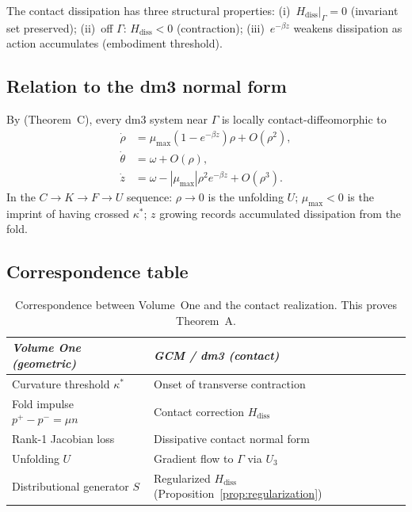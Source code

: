 \documentclass[12pt, oneside]{book}
\theoremstyle{plain}
\theoremstyle{definition}
\theoremstyle{remark}
\newcommand{\Orb}{\Gamma}
\newcommand{\abs}[1]{\left|#1\right|}
\begin{document}
The contact dissipation has three structural properties:
(i)~$H_{\mathrm{diss}}|_\Orb=0$ (invariant set preserved);
(ii)~off $\Orb$: $H_{\mathrm{diss}}<0$ (contraction);
(iii)~$e^{-\beta z}$ weakens dissipation as action accumulates
(embodiment threshold).

\subsection{Relation to the dm3 normal form}

By \cite{Paper1} (Theorem~C), every dm3 system near $\Orb$ is
locally contact-diffeomorphic to
\begin{align}
  \dot\rho &= \mu_{\max}(1-e^{-\beta z})\rho + O(\rho^2),\\
  \dot\theta &= \omega + O(\rho),\\
  \dot z &= \omega - \abs{\mu_{\max}}\rho^2 e^{-\beta z} + O(\rho^3).
\end{align}
In the $C\to K\to F\to U$ sequence:
$\rho\to 0$ is the unfolding $U$;
$\mu_{\max}<0$ is the imprint of having crossed $\kappa^*$;
$z$ growing records accumulated dissipation from the fold.

\subsection{Correspondence table}

\begin{table}[ht]
\centering
\begin{tabular}{ll}
\toprule
\emph{Volume One (geometric)} & \emph{GCM / dm3 (contact)} \\
\midrule
Curvature threshold $\kappa^*$
  & Onset of transverse contraction \\
Fold impulse $p^+-p^-=\mu n$
  & Contact correction $H_{\mathrm{diss}}$ \\
Rank-1 Jacobian loss
  & Dissipative contact normal form \\
Unfolding $U$
  & Gradient flow to $\Orb$ via $U_3$~\cite{Paper1} \\
Distributional generator $S$
  & Regularized $H_{\mathrm{diss}}$
    (Proposition~\ref{prop:regularization}) \\
\bottomrule
\end{tabular}
\caption{Correspondence between Volume~One and the contact
  realization. This proves Theorem~A.}
\label{tab:correspondence}
\end{table}

\end{document}
